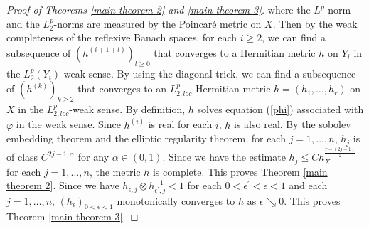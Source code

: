 \documentclass[12pt]{article}
\theoremstyle{definition}
\begin{document}
\begin{proof}[Proof of Theorems \ref{main theorem 2} and \ref{main theorem 3}]
where the $L^p$-norm and the $L^p_2$-norms are measured by the Poincar\'e metric on $X$. Then by the weak completeness of the reflexive Banach spaces, for each $i\geq 2$, we can find a subsequence of $(h^{(i+1+l)})_{l\geq 0}$ that converges to a Hermitian metric $h$ on $Y_i$ in the $L^p_2(Y_i)$-weak sense. By using the diagonal trick, we can find a subsequence of $(h^{(k)})_{k\geq 2}$ that converges to an $L^p_{2,loc}$-Hermitian metric $h=(h_1,\dots, h_r)$ on $X$ in the $L^p_{2,loc}$-weak sense. By definition, $h$ solves equation (\ref{phi}) associated with $\varphi$ in the weak sense. Since $h^{(i)}$ is real for each $i$, $h$ is also real. By the sobolev embedding theorem and the elliptic regularity theorem, for each $j=1,\dots, n$, $h_j$ is of class $C^{2j-1,\alpha}$ for any $\alpha\in(0,1)$. Since we have the estimate $h_j\leq Ch_X^{\frac{r-(2j-1)}{2}}$ for each $j=1,\dots, n$, the metric $h$ is complete. This proves Theorem \ref{main theorem 2}. Since we have $h_{\epsilon,j}\otimes h_{\epsilon^\prime,j}^{-1}<1$ for each $0<\epsilon^\prime<\epsilon<1$ and each $j=1,\dots, n$, $(h_\epsilon)_{0<\epsilon<1}$ monotonically converges to $h$ as $\epsilon\searrow 0$. This proves Theorem \ref{main theorem 3}. 

\end{proof}
\end{document}
